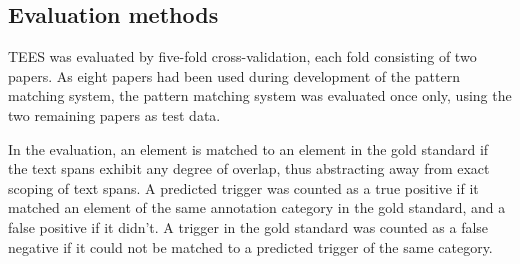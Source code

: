 

\subsection{Evaluation methods}

TEES was evaluated by five-fold cross-validation, each fold consisting of two papers. As eight papers had been used during development of the pattern matching system, the pattern matching system was evaluated once only, using the two remaining papers as test data.

In the evaluation, an element is matched to an element in the gold standard if the text spans exhibit any degree of overlap, thus abstracting away from exact scoping of text spans. A predicted trigger was counted as a true positive if it matched an element of the same annotation category in the gold standard, and a false positive if it didn't. A trigger in the gold standard was counted as a false negative if it could not be matched to a predicted trigger of the same category. 